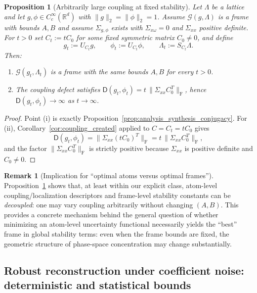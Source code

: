 \documentclass[final,1p,times,authoryear]{elsarticle}
\newtheorem{proposition}[theorem]{Proposition}
\theoremstyle{definition}
\newtheorem{remark}[theorem]{Remark}
\newcommand{\R}{\mathbb{R}}
\newcommand{\1}{\mathbf{1}}
\begin{document}
\begin{proposition}[Arbitrarily large coupling at fixed stability]\label{prop:coupling_vs_bounds}
Let $\Lambda$ be a lattice and let $g,\phi\in C_c^\infty(\R^d)$ with $\|g\|_2=\|\phi\|_2=1$.
Assume $\mathcal G(g,\Lambda)$ is a frame with bounds $A,B$ and assume $\Sigma_{g,\phi}$ exists with $\Sigma_{x\omega}=0$ and $\Sigma_{xx}$ positive definite.
For $t>0$ set $C_t:=tC_0$ for some fixed symmetric matrix $C_0\neq 0$, and define
$$
g_t:=U_{C_t}g,
\qquad
\phi_t:=U_{C_t}\phi,
\qquad
\Lambda_t:=S_{C_t}\Lambda.
$$
Then:
\begin{enumerate}[label=\textup{(\roman*)}]
\item $\mathcal G(g_t,\Lambda_t)$ is a frame with the same bounds $A,B$ for every $t>0$.
\item The coupling defect satisfies $\mathsf D(g_t,\phi_t)=t\,\|\Sigma_{xx}C_0^T\|_{\mathrm{F}}$, hence $\mathsf D(g_t,\phi_t)\to\infty$ as $t\to\infty$.
\end{enumerate}
\end{proposition}

\begin{proof}
Point (i) is exactly Proposition~\ref{prop:analysis_synthesis_conjugacy}.
For (ii), Corollary~\ref{cor:coupling_created} applied to $C=C_t=tC_0$ gives
$$
\mathsf D(g_t,\phi_t)=\|\Sigma_{xx}(tC_0)^T\|_{\mathrm{F}}=t\,\|\Sigma_{xx}C_0^T\|_{\mathrm{F}},
$$
and the factor $\|\Sigma_{xx}C_0^T\|_{\mathrm{F}}$ is strictly positive because $\Sigma_{xx}$ is positive definite and $C_0\neq 0$.
\end{proof}

\begin{remark}[Implication for ``optimal atoms versus optimal frames'']\label{rem:optimal_atoms_vs_frames}
Proposition~\ref{prop:coupling_vs_bounds} shows that, at least within our explicit class,
atom-level coupling/localization descriptors and frame-level stability constants can be \emph{decoupled}:
one may vary coupling arbitrarily without changing $(A,B)$.
This provides a concrete mechanism behind the general question of whether minimizing an atom-level
uncertainty functional necessarily yields the ``best'' frame in global stability terms:
even when the frame bounds are fixed, the geometric structure of phase-space concentration may change substantially.
\end{remark}

\subsection{Robust reconstruction under coefficient noise: deterministic and statistical bounds}\label{subsec:robustness}
\end{document}
